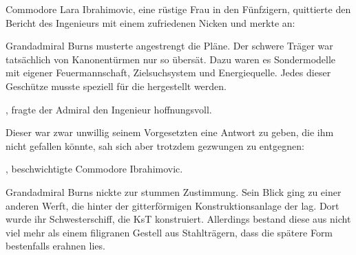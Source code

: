 \par

Commodore Lara Ibrahimovic, eine rüstige Frau in den Fünfzigern, quittierte den Bericht des Ingenieurs mit einem zufriedenen Nicken und merkte an: 

\par


\par

Grandadmiral Burns musterte angestrengt die Pläne. Der schwere Träger war tatsächlich von Kanonentürmen nur so übersät. Dazu waren es Sondermodelle mit eigener Feuermannschaft, Zielsuchsystem und Energiequelle. Jedes dieser Geschütze musste speziell für die  hergestellt werden.

\par

, fragte der Admiral den Ingenieur hoffnungsvoll.

\par

Dieser war zwar unwillig seinem Vorgesetzten eine Antwort zu geben, die ihm nicht gefallen könnte, sah sich aber trotzdem gezwungen zu entgegnen: 

\par

, beschwichtigte Commodore Ibrahimovic. 

\par

Grandadmiral Burns nickte zur stummen Zustimmung. Sein Blick ging zu einer anderen Werft, die hinter der gitterförmigen Konstruktionsanlage der  lag. Dort wurde ihr Schwesterschiff, die  KsT konstruiert. Allerdings bestand diese aus nicht viel mehr als einem filigranen Gestell aus Stahlträgern, dass die spätere Form bestenfalls erahnen lies.

